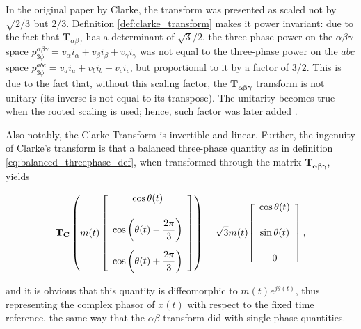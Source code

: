 	In the original paper by Clarke, the transform was presented as scaled not by $\sqrt{2/3}$ but $2/3$. Definition \ref{def:clarke_transform} makes it power invariant: due to the fact that $\mathbf{T}_{\alpha\beta\gamma}$ has a determinant of $\sqrt{3}/2$, the three-phase power on the $\alpha\beta\gamma$ space $p_{3\phi}^{\alpha\beta\gamma} = v_\alpha i_\alpha + v_\beta i_\beta + v_\gamma i_\gamma$ was not equal to the three-phase power on the $abc$ space $p_{3\phi}^{abc} = v_ai_a + v_bi_b + v_ci_c$, but proportional to it by a factor of $3/2$. This is due to the fact that, without this scaling factor, the $\mathbf{T_{\alpha\beta\gamma}}$ transform is not unitary (its inverse is not equal to its transpose). The unitarity becomes true when the rooted scaling is used; hence, such factor was later added .

	Also notably, the Clarke Transform is invertible and linear. Further, the ingenuity of Clarke's transform is that a balanced three-phase quantity as in definition \eqref{eq:balanced_threephase_def}, when transformed through the matrix $\mathbf{T_{\alpha\beta\gamma}}$, yields

\begin{equation} \mathbf{T_C} \left( m\hspace{-0.6mm}\left(t\right)\left[\begin{array}{c} \cos\theta\hspace{-0.6mm}\left(t\right) \\[5mm] \cos\left(\theta\hspace{-0.6mm}\left(t\right) - \dfrac{2\pi}{3}\right) \\[5mm] \cos\left(\theta\hspace{-0.6mm}\left(t\right) + \dfrac{2\pi}{3}\right) \end{array}\right] \right) = \sqrt{3}m(t)\hspace{-0.6mm}\left[\begin{array}{c} \cos\theta\hspace{-0.6mm}\left(t\right) \\[5mm] \sin\theta\hspace{-0.6mm}\left(t\right)\\[5mm] 0\end{array}\right], \end{equation}

	\noindent and it is obvious that this quantity is diffeomorphic to $m(t)e^{j\theta(t)}$, thus representing the complex phasor of $x(t)$ with respect to the fixed time reference, the same way that the $\alpha\beta$ transform did with single-phase quantities.


